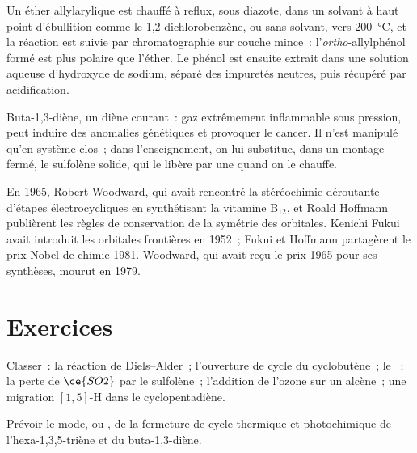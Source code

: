 \begin{inthelab}
Un éther allylarylique est chauffé à reflux, sous diazote, dans un solvant
à haut point d'ébullition comme le 1,2-dichlorobenzène, ou sans solvant,
vers \qty{200}{\celsius}, et la réaction est suivie par chromatographie sur couche mince~: l'\textit{ortho}-allylphénol formé
est plus polaire que l'éther. Le phénol est ensuite extrait dans une
solution aqueuse d'hydroxyde de sodium, séparé des impuretés neutres, puis
récupéré par acidification.
\end{inthelab}

\begin{safety}{}
Buta-1,3-diène, un diène courant~: gaz extrêmement inflammable sous
pression, peut induire des anomalies génétiques et provoquer le cancer. Il
n'est manipulé qu'en système clos~; dans l'enseignement, on lui substitue,
dans un montage fermé, le sulfolène solide, qui le libère par une  quand on le chauffe.
\end{safety}

\begin{history}
En 1965, Robert Woodward, qui avait rencontré la stéréochimie déroutante
d'étapes électrocycliques en synthétisant la vitamine B$_{12}$, et Roald Hoffmann publièrent
les règles de conservation de la symétrie des orbitales. Kenichi Fukui
avait introduit les orbitales frontières en 1952~; Fukui et Hoffmann
partagèrent le prix Nobel de chimie 1981. Woodward, qui avait reçu le prix
1965 pour ses synthèses, mourut en 1979.
\end{history}

\section{Exercices}

\begin{exercise}[$\star$]\label{exo:b3:pericyclic:1}
Classer~: la réaction de Diels--Alder~; l'ouverture de cycle du cyclobutène~; le ~; la perte de $\ce{SO2}$ par le sulfolène~; l'addition de l'ozone sur un alcène~;
une migration $[1,5]$-H dans le cyclopentadiène.
\end{exercise}

\begin{exercise}[$\star$]\label{exo:b3:pericyclic:2}
Prévoir le mode,  ou , de la fermeture de cycle
thermique et photochimique de l'hexa-1,3,5-triène et du buta-1,3-diène.
\end{exercise}

